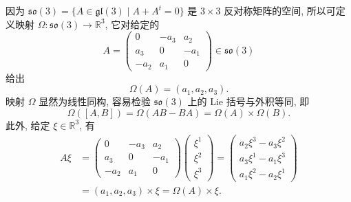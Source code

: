 \begin{description}[font=\normalfont,leftmargin=2em,labelwidth=1.5em]
因为 $\mathfrak{so}(3)=\{A\in\mathfrak{gl}(3)\mid A+A^t=0\}$ 是 $3\times3$ 反对称矩阵的空间, 所以可定义映射 $\Omega:\mathfrak{so}(3)\to\mathbb{R}^3$, 它对给定的
\[
  A=\begin{pmatrix}0&-a_3&a_2\\a_3&0&-a_1\\-a_2&a_1&0\end{pmatrix}\in\mathfrak{so}(3)
\]
给出
\[
  \Omega(A)=(a_1,a_2,a_3).
\]
映射 $\Omega$ 显然为线性同构, 容易检验 $\mathfrak{so}(3)$ 上的 Lie 括号与外积等同, 即
\[
  \Omega([A,B])=\Omega(AB-BA)=\Omega(A)\times\Omega(B).
\]
此外, 给定 $\xi\in\mathbb{R}^3$, 有
\begin{align*}
  A\xi&=\begin{pmatrix}0&-a_3&a_2\\a_3&0&-a_1\\-a_2&a_1&0\end{pmatrix}
        \begin{pmatrix}\xi^1\\\xi^2\\\xi^3\end{pmatrix}
       =\begin{pmatrix}a_2\xi^3-a_3\xi^2\\a_3\xi^1-a_1\xi^3\\a_1\xi^2-a_2\xi^1\end{pmatrix}\\
     &=(a_1,a_2,a_3)\times\xi=\Omega(A)\times\xi.
\end{align*}


\end{description}

